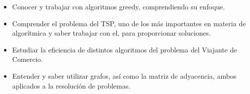 \begin{itemize}
    \item Conocer y trabajar con algoritmos greedy, comprendiendo su enfoque.
    \item Comprender el problema del TSP, uno de los más importantes en materia de algorítmica y saber trabajar con el, para proporcionar soluciones.
    \item Estudiar la eficiencia de distintos algoritmos del problema del Viajante de Comercio.
    \item Entender y saber utilizar grafos, así como la matriz de adyacencia, ambos aplicados a la resolución de problemas.
\end{itemize}
